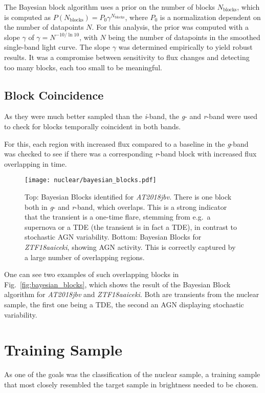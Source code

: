 The Bayesian block algorithm uses a prior on the number of blocks $N_\text{blocks}$, which is computed as $P(N_\text{blocks})= P_0 \gamma^{N_\text{blocks}} $, where $P_0$ is a normalization dependent on the number of datapoints $N$. For this analysis, the prior was computed with a slope $\gamma$ of $\gamma = N ^{-10/\ln{10}} $, with $N$ being the number of datapoints in the smoothed single-band light curve. The slope $\gamma$ was determined empirically to yield robust results. It was a compromise between sensitivity to flux changes and detecting too many blocks, each too small to be meaningful.

\subsection{Block Coincidence}
As they were much better sampled than the \textit{i}-band, the \textit{g}- and \textit{r}-band were used to check for blocks temporally coincident in both bands.

For this, each region with increased flux compared to a baseline in the \textit{g}-band was checked to see if there was a corresponding \textit{r}-band block with increased flux overlapping in time.

\begin{figure}
  \texttt{[image: nuclear/bayesian\_blocks.pdf]}
  \caption[Bayesian blocks]{Top: Bayesian Blocks identified for \textit{AT2018jbv}. There is one block both in \textit{g}- and \textit{r}-band, which overlaps. This is a strong indicator that the transient is a one-time flare, stemming from e.g.~a supernova or a TDE (the transient is in fact a TDE), in contrast to stochastic AGN variability. Bottom: Bayesian Blocks for \textit{ZTF18aaiceki}, showing AGN activity. This is correctly captured by a large number of overlapping regions.}
\end{figure}

One can see two examples of such overlapping blocks in Fig.~\ref{fig:bayesian_blocks}, which shows the result of the Bayesian Block algorithm for \textit{AT2018jbv} and \textit{ZTF18aaiceki}. Both are transients from the nuclear sample, the first one being a TDE, the second an AGN displaying stochastic variability.

\section{Training Sample}
As one of the goals was the classification of the nuclear sample, a training sample that most closely resembled the target sample in brightness needed to be chosen.

